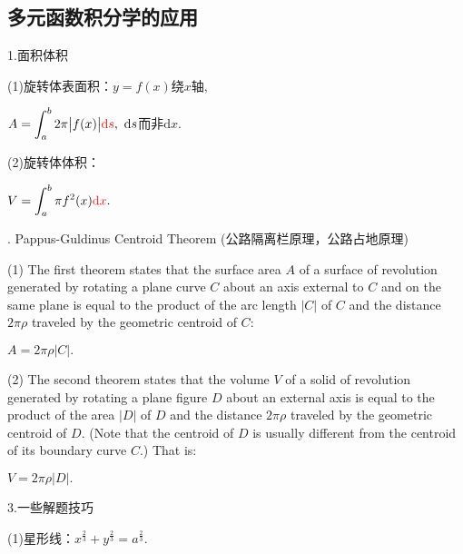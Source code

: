 \documentclass[UTF8]{ctexart}
\newcommand\dif{\mathrm{d}}
\newcommand\no{\noindent}
\newcommand\dis{\displaystyle}
\newcommand\intab{\dis\int_a^b}
\begin{document}
\begin{spacing}{2}
\vspace{1.5cm}

\subsection{多元函数积分学的应用}

\no1.面积体积

(1)旋转体表面积：$y=f(x)$绕$x$轴,

\centerline{$A=\intab 2\pi\big|f(x)\big|\textcolor[rgb]{1,0,0}{\dif s},\ \dif s$而非$\dif x.$}

(2)旋转体体积：

\centerline{$V=\intab\pi f^2(x)\textcolor[rgb]{1,0,0}{\dif x}.$}

\no2. Pappus-Guldinus Centroid Theorem (公路隔离栏原理，公路占地原理)

(1) \textcolor[rgb]{1,0,0}{The first theorem} states that the surface area $A$ of a surface of revolution generated by rotating a plane curve $C$ about an axis external to $C$ and on the same plane is equal to the product of the arc length $\big|C\big|$ of $C$ and the distance $2\pi\rho$ traveled by the geometric centroid of $C$:

\centerline{$A=2\pi\rho\big|C\big|.$}

(2) \textcolor[rgb]{1,0,0}{The second theorem} states that the volume $V$ of a solid of revolution generated by rotating a plane figure $D$ about an external axis is equal to the product of the area $\big|D\big|$ of $D$ and the distance $2\pi\rho$ traveled by the geometric centroid of $D$. (Note that the centroid of $D$ is usually different from the centroid of its boundary curve $C$.) That is:

\centerline{$V=2\pi\rho\big|D\big|.$}

\no3.一些解题技巧

(1)星形线：$\dis x^{\tfrac{2}{3}}+y^{\tfrac{2}{3}}=a^{\tfrac{2}{3}}.$

\begin{center}



\end{center}
\end{spacing}
\end{document}
